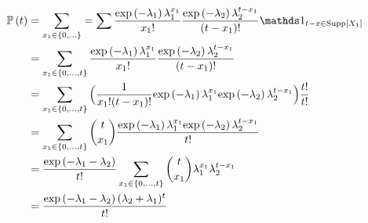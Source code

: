 \documentclass[12pt]{article}
\begin{document}
\begin{enumerate}
\begin{align*}
    \prob{t} &= \sum_{x_1 \in \braces{0, \ldots}} = \sum \frac{\exp{-\lambda_1}\lambda_{1}^{x_{1}}}{x_{1}!} \frac{\exp{-\lambda_2}\lambda_{2}^{t-x_1}}{(t-x_1)!}\indic{t-x \in \support{X_1}} \\
    &= \sum_{x_1 \in \braces{0,\ldots,t}} \frac{\exp{-\lambda_1}\lambda_{1}^{x_{1}}}{x_{1}!} \frac{\exp{-\lambda_2}\lambda_{2}^{t-x_1}}{(t-x_1)!} \\
    &= \sum_{x_1 \in \braces{0,\ldots,t}} \Big(\frac{1}{x_1!(t-x_1)!} \exp{-\lambda_1}\lambda_{1}^{x_{1}} \exp{-\lambda_2}\lambda_{2}^{t-x_1}\Big)\frac{t!}{t!} \\
    &= \sum_{x_1 \in \braces{0,\ldots,t}} {t \choose x_1} \frac{\exp{-\lambda_1}\lambda_{1}^{x_{1}}\exp{-\lambda_2}\lambda_{2}^{t-x_1}}{t!} \\
    &= \frac{\exp{-\lambda_{1} - \lambda_{2}}}{t!} \sum_{x_1 \in \braces{0,\ldots,t}} {t \choose x_1} \lambda_{1}^{x_1}\lambda_{2}^{t-x_1} \\
    &= \frac{\exp{-\lambda_{1} - \lambda_{2}} (\lambda_2 + \lambda_1)^t}{t!}
\end{align*}


\end{enumerate}


\end{document}
